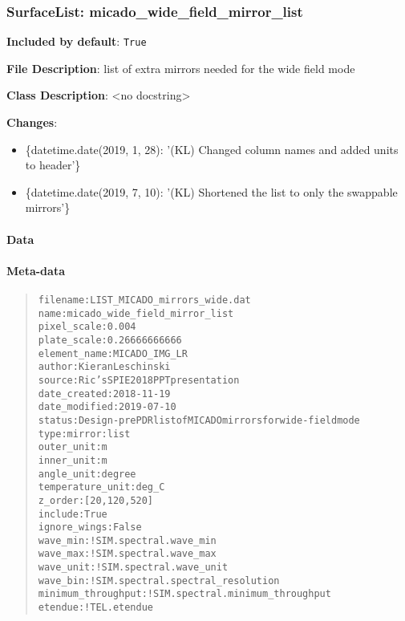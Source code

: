 \subsubsection{SurfaceList: \textquotedbl{}micado\_wide\_field\_mirror\_list\textquotedbl{}%
  \label{surfacelist-micado-wide-field-mirror-list}%
}

\textbf{Included by default}: \texttt{True}

\textbf{File Description}: list of extra mirrors needed for the wide field mode

\textbf{Class Description}: <no docstring>

\textbf{Changes}:

\begin{itemize}
\item \{datetime.date(2019, 1, 28): '(KL) Changed column names and added units to header'\}

\item \{datetime.date(2019, 7, 10): '(KL) Shortened the list to only the swappable mirrors'\}
\end{itemize}


\paragraph{Data%
  \label{data}%
}


\paragraph{Meta-data%
  \label{meta-data}%
}

\begin{quote}
\begin{alltt}
          filename : LIST_MICADO_mirrors_wide.dat
              name : micado_wide_field_mirror_list
       pixel_scale : 0.004
       plate_scale : 0.26666666666
      element_name : MICADO_IMG_LR
            author : Kieran Leschinski
            source : Ric's SPIE 2018 PPT presentation
      date_created : 2018-11-19
     date_modified : 2019-07-10
            status : Design - pre PDR list of MICADO mirrors for wide-field mode
              type : mirror:list
        outer_unit : m
        inner_unit : m
        angle_unit : degree
  temperature_unit : deg_C
           z_order : [20, 120, 520]
           include : True
      ignore_wings : False
          wave_min : !SIM.spectral.wave_min
          wave_max : !SIM.spectral.wave_max
         wave_unit : !SIM.spectral.wave_unit
          wave_bin : !SIM.spectral.spectral_resolution
minimum_throughput : !SIM.spectral.minimum_throughput
           etendue : !TEL.etendue
\end{alltt}
\end{quote}


